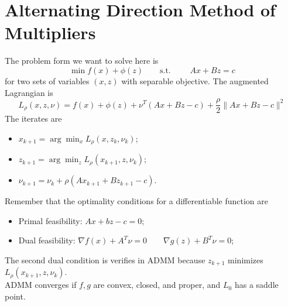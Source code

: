 \documentclass[12pt, openany]{report}
\theoremstyle{definition}
\begin{document}
\section{Alternating Direction Method of Multipliers}
The problem form we want to solve here is 
\begin{equation}
	\min f(x)+\phi(z)\qquad \text{s.t. }\qquad  Ax+Bz=c
\end{equation}
for two sets of variables $(x,z)$ with separable objective. The augmented Lagrangian is 
\begin{equation}
	L_\rho(x,z,\nu) = f(x) + \phi(z) + \nu^T(Ax+Bz-c)+\frac{\rho}{2}\|Ax+Bz-c\|^2
\end{equation}
The iterates are 
\begin{itemize}
	\item $x_{k+1} = \arg\min_x L_\rho(x,z_k,\nu_k)$;
	\item $z_{k+1} = \arg\min_z L_\rho({x_{k+1},z,\nu_k})$;
	\item $\nu_{k+1} = \nu_k + \rho(Ax_{k+1}+Bz_{k+1}-c)$.
\end{itemize}
Remember that the optimality conditions for a differentiable function are 
\begin{itemize}
	\item Primal feasibility: $Ax+bz-c=0$;
	\item Dual feasibility: $\nabla f(x) + A^T\nu = 0\qquad \nabla g(z)+B^T\nu = 0$; 
\end{itemize}
The second dual condition is verifies in ADMM because $z_{k+1}$ minimizes $L_\rho(x_{k+1},z,\nu_k)$.\\
ADMM converges if $f,g$ are convex, closed, and proper, and $L_0$ has a saddle point.\\
\end{document}
